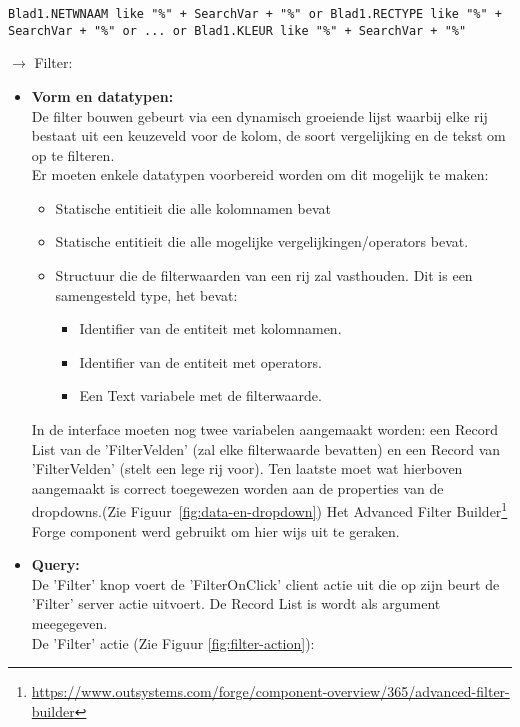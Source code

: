 \begin{lstlisting}
Blad1.NETWNAAM like "%" + SearchVar + "%" or Blad1.RECTYPE like "%" + SearchVar + "%" or ... or Blad1.KLEUR like "%" + SearchVar + "%"
\end{lstlisting}

$\rightarrow$ Filter:
\begin{itemize}
    \item \textbf{Vorm en datatypen:}\\
    De filter bouwen gebeurt via een dynamisch groeiende lijst waarbij elke rij bestaat uit een keuzeveld voor de kolom, de soort vergelijking en de tekst om op te filteren.\\
    Er moeten enkele datatypen voorbereid worden om dit mogelijk te maken:
    \begin{itemize}
        \item Statische entitieit die alle kolomnamen bevat
        \item Statische entitieit die alle mogelijke vergelijkingen/operators bevat.
        \item Structuur die de filterwaarden van een rij zal vasthouden. Dit is een samengesteld type, het bevat:
        \begin{itemize}
            \item Identifier van de entiteit met kolomnamen.
            \item Identifier van de entiteit met operators.
            \item Een Text variabele met de filterwaarde.
        \end{itemize}
    \end{itemize}
    In de interface moeten nog twee variabelen aangemaakt worden: een Record List van de 'FilterVelden' (zal elke filterwaarde bevatten) en een Record van 'FilterVelden' (stelt een lege rij voor). Ten laatste moet wat hierboven aangemaakt is correct toegewezen worden aan de properties van de dropdowns.(Zie Figuur~\ref{fig:data-en-dropdown})
    Het Advanced Filter Builder\footnote{\url{https://www.outsystems.com/forge/component-overview/365/advanced-filter-builder}} Forge component werd gebruikt om hier wijs uit te geraken.\\
    \item \textbf{Query:}\\
    De 'Filter' knop voert de 'FilterOnClick' client actie uit die op zijn beurt de 'Filter' server actie uitvoert. De Record List is wordt als argument meegegeven.\\
    De 'Filter' actie (Zie Figuur \ref{fig:filter-action}):

\end{itemize}
